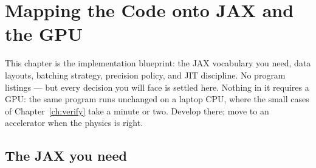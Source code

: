 \chapter{Mapping the Code onto JAX and the GPU}
\label{ch:gpu}

This chapter is the implementation blueprint: the JAX vocabulary you need,
data layouts, batching strategy, precision policy, and JIT discipline. No
program listings --- but every decision you will face is settled here.
Nothing in it requires a GPU: the same program runs unchanged on a laptop
CPU, where the small cases of Chapter~\ref{ch:verify} take a minute or two.
Develop there; move to an accelerator when the physics is right.

\section{The JAX you need}
\label{sec:jaxprimer}

